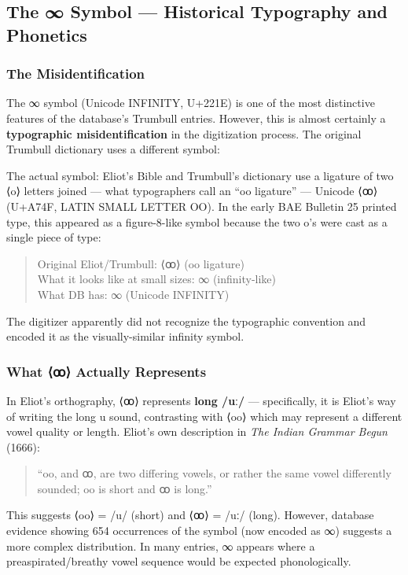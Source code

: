 \subsection{The ∞ Symbol --- Historical Typography and Phonetics}
\label{sec:1363-infinity}

\subsubsection{The Misidentification}

The ∞ symbol (Unicode INFINITY, U+221E) is one of the most distinctive
features of the database's Trumbull entries. However, this is almost
certainly a \textbf{typographic misidentification} in the digitization
process. The original Trumbull dictionary uses a different symbol:

The actual symbol: Eliot's Bible and Trumbull's dictionary use a ligature of
two ⟨o⟩ letters joined --- what typographers call an ``oo ligature'' ---
Unicode ⟨ꝏ⟩ (U+A74F, LATIN SMALL LETTER OO). In the early BAE Bulletin 25
printed type, this appeared as a figure-8-like symbol because the two o's
were cast as a single piece of type:

\begin{quote}
Original Eliot/Trumbull: ⟨ꝏ⟩ (oo ligature)\\
What it looks like at small sizes: ∞ (infinity-like)\\
What DB has: ∞ (Unicode INFINITY)
\end{quote}

The digitizer apparently did not recognize the typographic convention and
encoded it as the visually-similar infinity symbol.

\subsubsection{What ⟨ꝏ⟩ Actually Represents}

In Eliot's orthography, ⟨ꝏ⟩ represents \textbf{long /uː/} --- specifically,
it is Eliot's way of writing the long u sound, contrasting with ⟨oo⟩ which
may represent a different vowel quality or length. Eliot's own description in
\emph{The Indian Grammar Begun} (1666):

\begin{quote}
``oo, and ꝏ, are two differing vowels, or rather the same vowel differently
sounded; oo is short and ꝏ is long.''
\end{quote}

This suggests ⟨oo⟩ = /u/ (short) and ⟨ꝏ⟩ = /uː/ (long). However, database
evidence showing 654 occurrences of the symbol (now encoded as ∞) suggests a
more complex distribution. In many entries, ∞ appears where a
preaspirated/breathy vowel sequence would be expected phonologically.

